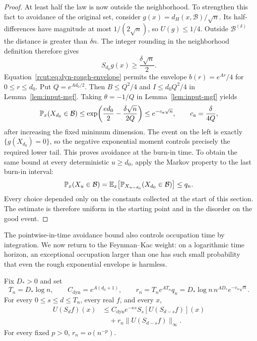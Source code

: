 \begin{proof}
At least half the law is now outside the neighborhood.  To strengthen
this fact to avoidance of the original set, consider
$g(x)=d_H(x,\mathcal B)/\sqrt n$.  Its half-differences have magnitude
at most $1/(2\sqrt n)$, so $U(g)\le1/4$.
Outside $\mathcal B^{(\delta)}$ the distance is greater than $\delta n$.
The integer rounding in the neighborhood definition therefore gives
\[
 S_{d_0}g(x)\ge\frac{\delta\sqrt n}{2}.
\]
Equation~\eqref{rcut:eq:dyn-rough-envelope} permits the envelope
$b(r)=e^{Ar}/4$ for $0\le r\le d_0$.
Put $Q=e^{Ad_0/2}$.  Then $B\le Q^2/4$ and
$I\le d_0Q^2/4$ in Lemma~\ref{lem:input-mgf}.
Taking $\theta=-1/Q$ in Lemma~\ref{lem:input-mgf} yields
\[
 \P_x(X_{d_0}\in\mathcal B)
 \le\exp\!\left(\frac{e d_0}{2}
                 -\frac{\delta\sqrt n}{2Q}\right)
 \le e^{-c_{\mathrm a}\sqrt n},
 \qquad c_{\mathrm a}=\frac{\delta}{4Q},
\]
after increasing the fixed minimum dimension.  The event on the left
is exactly $\{g(X_{d_0})=0\}$, so the negative exponential moment
controls precisely the required lower tail.  This proves avoidance at
the burn-in time.  To obtain the same bound at every deterministic
$u\ge d_0$, apply the Markov property to the last burn-in interval:
\[
 \P_x(X_u\in\mathcal B)
 =\E_x\!\left[\P_{X_{u-d_0}}(X_{d_0}\in\mathcal B)\right]
 \le q_n.
\]
Every choice depended only on the constants collected at the start of
this section.  The estimate is therefore uniform in the starting point
and in the disorder on the good event.
\end{proof}

The pointwise-in-time avoidance bound also controls occupation time by
integration.  We now return to the Feynman--Kac weight: on a logarithmic
time horizon, an exceptional occupation larger than one has such small
probability that even the rough exponential envelope is harmless.

\begin{lemma}
\label{rcut:lem:dyn-occupation-propagation}
Fix $D_*>0$ and set
\begin{equation}
 T_n=D_*\log n,\qquad
 C_{\mathrm{dyn}}=e^{A(d_0+1)},\qquad
 r_n=T_ne^{AT_n}q_n
     =D_*\log n\,n^{AD_*}e^{-c_{\mathrm a}\sqrt n}.
 \label{rcut:eq:dyn-occupation-error}
\end{equation}
For every $0\le s\le d\le T_n$, every real $f$, and every $x$,
\begin{equation}
 \begin{split}
 U(S_d f)(x)
 &\le C_{\mathrm{dyn}}e^{-\kappa s}
      S_s\!\left[U(S_{d-s}f)\right](x)\\
 &\quad+r_n\|U(S_{d-s}f)\|_\infty.
 \end{split}
 \label{rcut:eq:gradient-propagation}
\end{equation}
For every fixed $p>0$, $r_n=o(n^{-p})$.
\end{lemma}

